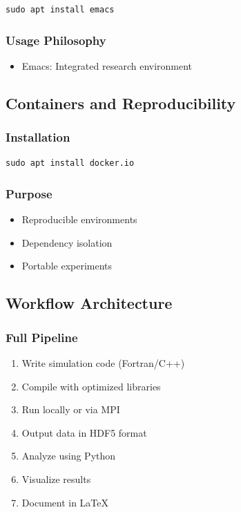 \begin{lstlisting}
sudo apt install emacs
\end{lstlisting}

\subsubsection{Usage Philosophy}

\begin{itemize}
    \item Emacs: Integrated research environment
\end{itemize}

\subsection{Containers and Reproducibility}

\subsubsection{Installation}

\begin{lstlisting}
sudo apt install docker.io
\end{lstlisting}

\subsubsection{Purpose}

\begin{itemize}
    \item Reproducible environments
    \item Dependency isolation
    \item Portable experiments
\end{itemize}

\subsection{Workflow Architecture}

\subsubsection{Full Pipeline}

\begin{enumerate}
    \item Write simulation code (Fortran/C++)
    \item Compile with optimized libraries
    \item Run locally or via MPI
    \item Output data in HDF5 format
    \item Analyze using Python
    \item Visualize results
    \item Document in LaTeX
\end{enumerate}

